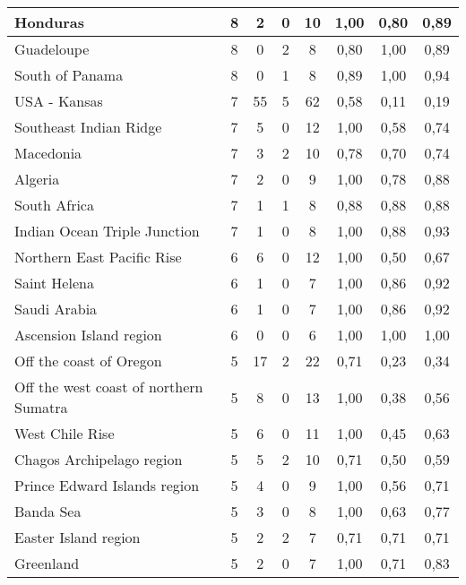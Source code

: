 {\begin{table}[!ht]
\begin{tabular}{|l|ccc|c|ccc|}
Honduras	 & 8 	 & 2 	 & 0   	& 10	 & 1,00 &	0,80 &	0,89 \\ \hline
Guadeloupe	 & 8 	 & 0   	 & 2 	& 8	 & 0,80 &	1,00 &	0,89 \\ \hline
South of Panama	 & 8 	 & 0   	 & 1 	& 8	 & 0,89 &	1,00 &	0,94 \\ \hline
USA - Kansas	 & 7 	 & 55 	 & 5 	& 62	 & 0,58 &	0,11 &	0,19 \\ \hline
Southeast Indian Ridge	 & 7 	 & 5 	 & 0   	& 12	 & 1,00 &	0,58 &	0,74 \\ \hline
Macedonia	 & 7 	 & 3 	 & 2 	& 10	 & 0,78 &	0,70 &	0,74 \\ \hline
Algeria	 & 7 	 & 2 	 & 0   	& 9	 & 1,00 &	0,78 &	0,88 \\ \hline
South Africa	 & 7 	 & 1 	 & 1 	& 8	 & 0,88 &	0,88 &	0,88 \\ \hline
Indian Ocean Triple Junction	 & 7 	 & 1 	 & 0   	& 8	 & 1,00 &	0,88 &	0,93 \\ \hline
Northern East Pacific Rise	 & 6 	 & 6 	 & 0   	& 12	 & 1,00 &	0,50 &	0,67 \\ \hline
Saint Helena	 & 6 	 & 1 	 & 0   	& 7	 & 1,00 &	0,86 &	0,92 \\ \hline
Saudi Arabia	 & 6 	 & 1 	 & 0   	& 7	 & 1,00 &	0,86 &	0,92 \\ \hline
Ascension Island region	 & 6 	 & 0   	 & 0   	& 6	 & 1,00 &	1,00 &	1,00 \\ \hline
Off the coast of Oregon	 & 5 	 & 17 	 & 2 	& 22	 & 0,71 &	0,23 &	0,34 \\ \hline
Off the west coast of northern Sumatra	 & 5 	 & 8 	 & 0   	& 13	 & 1,00 &	0,38 &	0,56 \\ \hline
West Chile Rise	 & 5 	 & 6 	 & 0   	& 11	 & 1,00 &	0,45 &	0,63 \\ \hline
Chagos Archipelago region	 & 5 	 & 5 	 & 2 	& 10	 & 0,71 &	0,50 &	0,59 \\ \hline
Prince Edward Islands region	 & 5 	 & 4 	 & 0   	& 9	 & 1,00 &	0,56 &	0,71 \\ \hline
Banda Sea	 & 5 	 & 3 	 & 0   	& 8	 & 1,00 &	0,63 &	0,77 \\ \hline
Easter Island region	 & 5 	 & 2 	 & 2 	& 7	 & 0,71 &	0,71 &	0,71 \\ \hline
Greenland	 & 5 	 & 2 	 & 0   	& 7	 & 1,00 &	0,71 &	0,83 \\ \hline
   \end{tabular}
\end{table}}

